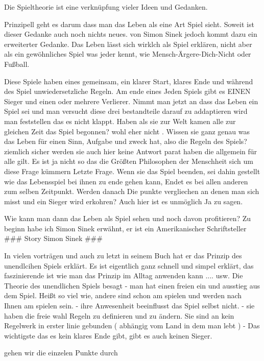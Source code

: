 
Die Spieltheorie ist eine verknüpfung vieler Ideen und Gedanken. 

Prinzipell geht es darum dass man das Leben als eine Art Spiel sieht. 
Soweit ist dieser Gedanke auch noch nichts neues. von Simon Sinek jedoch kommt dazu ein erweiterter Gedanke. 
Das Leben lässt sich wirklch als Spiel erklären, nicht aber als ein gewöhnliches Spiel was jeder kennt, wie Mensch-Ärgere-Dich-Nicht oder Fußball. 

Diese Spiele haben eines gemeinsam, ein klarer Start, klares Ende und während des Spiel unwiedersetzliche Regeln. Am ende eines Jeden Spiels gibt es EINEN Sieger und einen oder mehrere Verlierer.
Nimmt man jetzt an dass das Leben ein Spiel sei und man versucht diese drei bestandteile darauf zu addaptieren wird man feststellen das es nicht klappt. 
    Haben als sie zur Welt kamen alle zur gleichen Zeit das Spiel begonnen? wohl eher nicht .
    Wissen sie ganz genau was das Leben für einen Sinn, Aufgabe und zweck hat, also die Regeln des Spiels? ziemlich sicher werden sie auch hier keine Antwort parat haben die allgemein für alle gilt. Es ist ja nicht so das die Größten Philosophen der Menschheit sich um diese Frage kümmern 
    Letzte Frage. Wenn sie das Spiel beenden, sei dahin gestellt wie das Lebensspiel bei ihnen zu ende gehen kann, Endet es bei allen anderen zum selben Zeitpunkt. Werden danach Die punkte vergliechen an denen man sich misst und ein Sieger wird erkohren? Auch hier ist es unmöglich Ja zu sagen.

Wie kann man dann das Leben als Spiel sehen und noch davon profitieren? 
Zu beginn habe ich Simon Sinek erwähnt, er ist ein Amerikanischer Schriftsteller
###
 Story Simon Sinek
###

In vielen vorträgen und auch zu letzt in seinem Buch hat er das Prinzip des unendlcihen Spiels erklärt. 
Es ist eigentlich ganz schnell und simpel erklärt, das faszinierende ist wie man das Prinzip im Alltag anwenden kann .... usw.
Die Theorie des unendlichen Spiels besagt 
    - man hat einen freien ein und ausstieg aus dem Spiel. Heißt so viel wie, andere sind schon am spielen und werden nach Ihnen am spielen sein.
    - ihre Anwesenheit beeinflusst das Spiel selbst nicht. 
    - sie haben die freie wahl Regeln zu definieren und zu ändern. Sie sind an kein Regelwerk in erster linie gebunden ( abhängig vom Land in dem man lebt )
    - Das wichtigste das es kein klares Ende gibt, gibt es auch keinen Sieger. 

gehen wir die einzelen Punkte durch 

